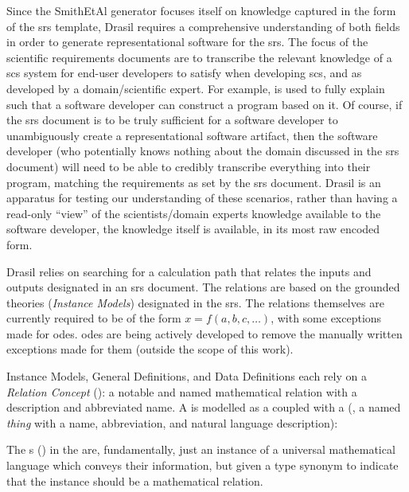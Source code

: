 Since the SmithEtAl generator focuses itself on knowledge captured in the form
of the \acs{srs} template, Drasil requires a comprehensive understanding of both
fields in order to generate representational software for the \acs{srs}. The
focus of the scientific requirements documents are to transcribe the relevant
knowledge of a \acs{scs} system for end-user developers to satisfy when
developing \acs{scs}, and as developed by a domain/scientific expert. For
example,  is used to fully explain 
such that a software developer can construct a program based on it. Of course,
if the \acs{srs} document is to be truly sufficient for a software developer to
unambiguously create a representational software artifact, then the software
developer (who potentially knows nothing about the domain discussed in the
\acs{srs} document) will need to be able to credibly transcribe everything into
their program, matching the requirements as set by the \acs{srs} document.
Drasil is an apparatus for testing our understanding of these scenarios, rather
than having a read-only ``view'' of the scientists/domain experts knowledge
available to the software developer, the knowledge itself is available, in its
most raw encoded form.

Drasil relies on searching for a calculation path that relates the inputs and
outputs designated in an \acs{srs} document. The relations are based on the
grounded theories (\textit{Instance Models}) designated in the \acs{srs}. The
relations themselves are currently required to be of the form \(x = f(a, b, c,
\ldots{})\), with some exceptions made for \acsp{ode}. \acsp{ode} are being
actively developed to remove the manually written exceptions made for them
(outside the scope of this work).

Instance Models, General Definitions, and Data Definitions each rely on a
\textit{Relation Concept} (\RelationConcept{}): a notable and named mathematical
relation with a description and abbreviated name. A \RelationConcept{} is
modelled as a \Relation{} coupled with a \ConceptChunk{}
(, a named \textit{thing} with a name,
abbreviation, and natural language description):

\originalRelationConcept{}

The \Relation{}s () in the \RelationConcept{} are,
fundamentally, just an instance of a universal mathematical language which
conveys their information, but given a type synonym to indicate that the
instance should be a mathematical relation.

